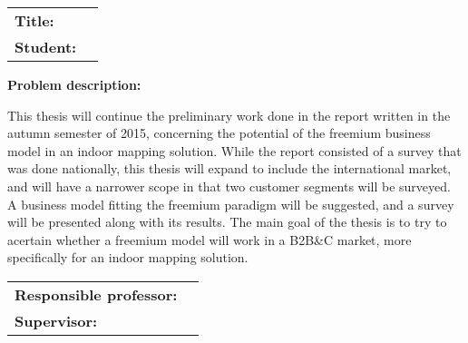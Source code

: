 \begin{titlingpage}

\noindent
\begin{tabular}{@{}p{4cm}l}
\textbf{Title:} 	& \thetitle \\
\textbf{Student:}	& \theauthor \\
\end{tabular}

\vspace{4ex}
\noindent\textbf{Problem description:}
\vspace{2ex}

\noindent This thesis will continue the preliminary work done in the report written in the autumn semester of 2015, concerning the potential of the freemium business model in an indoor mapping solution. While the report consisted of a survey that was done nationally, this thesis will expand to include the international market, and will have a narrower scope in that two customer segments will be surveyed. A business model fitting the freemium paradigm will be suggested, and a survey will be presented along with its results. The main goal of the thesis is to try to acertain whether a freemium model will work in a B2B\&C market, more specifically for an indoor mapping solution.
\vspace{6ex}

\noindent
\begin{tabular}{@{}p{4cm}l}
\textbf{Responsible professor:} 	& \theprofessor \\
\textbf{Supervisor:}			& \thesupervisor \\
\end{tabular}

\end{titlingpage}